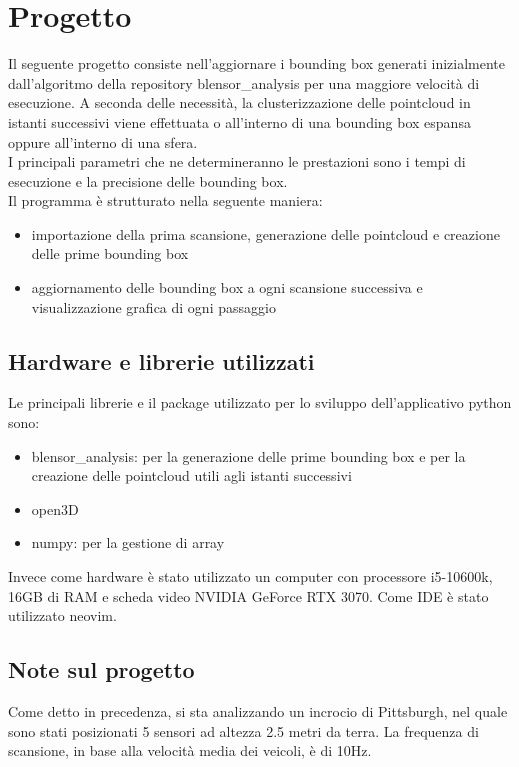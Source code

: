 \documentclass[italian]{article}
\begin{document}
\section*{Progetto}
Il seguente progetto consiste nell'aggiornare i bounding box generati inizialmente dall'algoritmo della repository blensor\_analysis per una maggiore velocità di esecuzione. A seconda delle necessità, la clusterizzazione delle pointcloud in istanti successivi viene effettuata o all'interno di una bounding box espansa oppure all'interno di una sfera.\\
I principali parametri che ne determineranno le prestazioni sono i tempi di esecuzione e la precisione delle bounding box.\\ %
Il programma è strutturato nella seguente maniera:
\begin{itemize}
	\item importazione della prima scansione, generazione delle pointcloud e creazione delle prime bounding box
	\item aggiornamento delle bounding box a ogni scansione successiva e visualizzazione grafica di ogni passaggio
\end{itemize}
\subsection{Hardware e librerie utilizzati}
Le principali librerie e il package utilizzato per lo sviluppo dell'applicativo python sono:
\begin{itemize}
	\item blensor\_analysis: per la generazione delle prime bounding box e per la creazione delle pointcloud utili agli istanti successivi
	\item open3D
	\item numpy: per la gestione di array
\end{itemize}
Invece come hardware è stato utilizzato un computer con processore i5-10600k, 16GB di RAM e scheda video NVIDIA GeForce RTX 3070. Come IDE è stato utilizzato neovim.
\subsection{Note sul progetto}
Come detto in precedenza, si sta analizzando un incrocio di Pittsburgh, nel quale sono stati posizionati 5 sensori ad altezza 2.5 metri da terra. La frequenza di scansione, in base alla velocità media dei veicoli, è di 10Hz.\\
\end{document}
